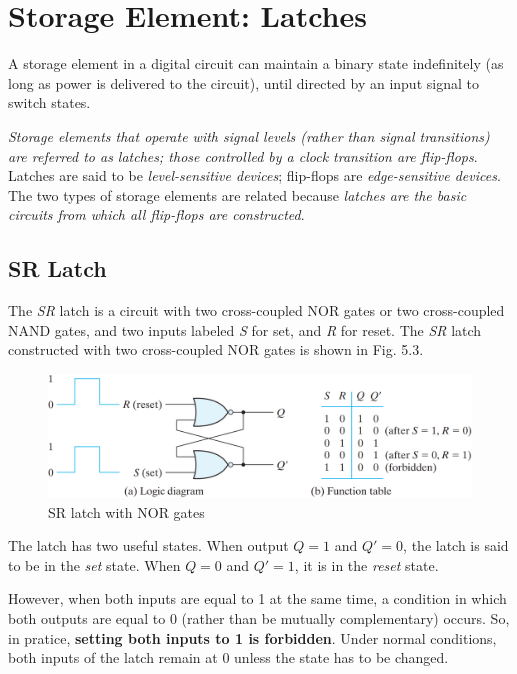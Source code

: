 \section{Storage Element: Latches}
\label{sec:stor-ele-latch}

A storage element in a digital circuit can maintain a binary state indefinitely (as long as power is delivered to the circuit), until directed by an input signal to switch states.

\textit{Storage elements that operate with signal levels (rather than signal transitions) are referred to as latches; those controlled by a clock transition are flip-flops}. Latches are said to be \textit{level-sensitive devices}; flip-flops are \textit{edge-sensitive devices}. The two types of storage elements are related because \textit{latches are the basic circuits from which all flip-flops are constructed}.

\subsection{SR Latch}
\label{subsec:sr-latch}

The \textit{SR} latch is a circuit with two cross-coupled NOR gates or two cross-coupled NAND gates, and two inputs labeled \textit{S} for set, and \textit{R} for reset. The \textit{SR} latch constructed with two cross-coupled NOR gates is shown in Fig. 5.3. 
\begin{figure}[H]
  \centering
  \includegraphics[width=\linewidth]{img/fig-5.3.png}
  \caption{SR latch with NOR gates}
  \label{fig:5.3}
\end{figure}
\noindent The latch has two useful states. When output $Q = 1$ and $Q' = 0$, the latch is said to be in the \textit{set} state. When $Q = 0$ and $Q' = 1$, it is in the \textit{reset} state.

However, when both inputs are equal to 1 at the same time, a condition in which both outputs are equal to 0 (rather than be mutually complementary) occurs. So, in pratice, \textbf{setting both inputs to 1 is forbidden}. Under normal conditions, both inputs of the latch remain at 0 unless the state has to be changed.

